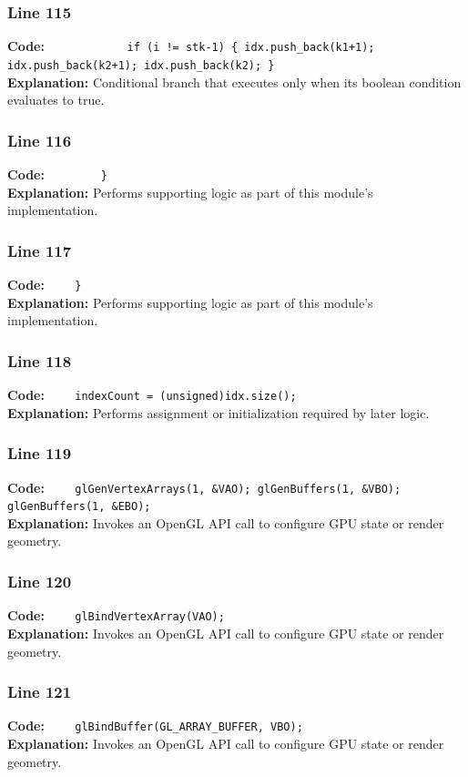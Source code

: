 \documentclass[11pt,a4paper]{article}
\begin{document}
\subsubsection*{Line 115}
\textbf{Code:} \verb|            if (i != stk-1) { idx.push_back(k1+1); idx.push_back(k2+1); idx.push_back(k2); }|\\
\textbf{Explanation:} Conditional branch that executes only when its boolean condition evaluates to true.

\subsubsection*{Line 116}
\textbf{Code:} \verb|        }|\\
\textbf{Explanation:} Performs supporting logic as part of this module's implementation.

\subsubsection*{Line 117}
\textbf{Code:} \verb|    }|\\
\textbf{Explanation:} Performs supporting logic as part of this module's implementation.

\subsubsection*{Line 118}
\textbf{Code:} \verb|    indexCount = (unsigned)idx.size();|\\
\textbf{Explanation:} Performs assignment or initialization required by later logic.

\subsubsection*{Line 119}
\textbf{Code:} \verb|    glGenVertexArrays(1, &VAO); glGenBuffers(1, &VBO); glGenBuffers(1, &EBO);|\\
\textbf{Explanation:} Invokes an OpenGL API call to configure GPU state or render geometry.

\subsubsection*{Line 120}
\textbf{Code:} \verb|    glBindVertexArray(VAO);|\\
\textbf{Explanation:} Invokes an OpenGL API call to configure GPU state or render geometry.

\subsubsection*{Line 121}
\textbf{Code:} \verb|    glBindBuffer(GL_ARRAY_BUFFER, VBO);|\\
\textbf{Explanation:} Invokes an OpenGL API call to configure GPU state or render geometry.
\end{document}
